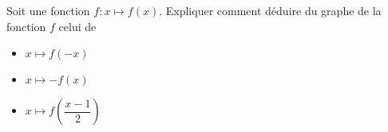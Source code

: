 \bexo
Soit une fonction $f:x\mapsto f(x)$. Expliquer comment déduire du graphe de la fonction $f$ celui de 
\begin{itemize}
	\item $x\mapsto f(-x)$
	\item $x\mapsto -f(x)$
	\item $x\mapsto f\left(\dfrac{x-1}{2}\right)$
\end{itemize}
	
	\ifsolutions \else 
\vspace*{8cm}
\fi 
\eexo
%
%
